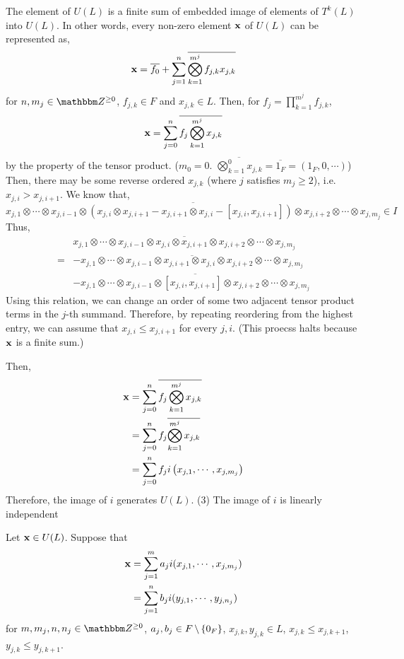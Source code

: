 The element of \(U(L)\) is a finite sum of embedded image of
elements of \(T^k(L)\) into \(U(L)\).
In other words, every non-zero element \(\mathbf{x}\) of \(U(L)\)
can be represented as,
\[\mathbf{x} = \overline{f_0} + \sum_{j=1}^{n} \overline{ \bigotimes_{k=1}^{m^j} f_{j,k} x_{j,k} }\]
for \(n, m_j \in \bbZ^{\ge 0}\), \(f_{j,k} \in F\) and \(x_{j, k} \in L\).
Then, for \(f_j = \prod_{k=1}^{m^j} f_{j,k}\),
\[\mathbf{x} = \sum_{j=0}^{n}  \overline{ f_j \bigotimes_{k=1}^{m^j} x_{j,k} }\]
by the property of the tensor product.
(\(m_0 = 0\). \(\overline{\bigotimes_{k=1}^{0} x_{j,k}} = \overline{1_F} = (1_F, 0, \cdots)\))
Then, there may be some reverse ordered \(x_{j, k}\) (where \(j\) satisfies \(m_j \ge 2\)),
i.e. \(x_{j, i} > x_{j, i+1}\).
We know that,
\[
  \overline{
  x_{j,1} \otimes \cdots \otimes x_{j,i-1} \otimes
  (x_{j,i} \otimes x_{j,i+1} - x_{j,i+1} \otimes x_{j,i} - [x_{j,i}, x_{j,i+1}]) \otimes x_{j,i+2} \otimes \cdots \otimes x_{j,m_j}
  }
  \in I
\]
Thus,
\begin{align*}
  &\overline{
  x_{j,1} \otimes \cdots \otimes x_{j,i-1} \otimes
  x_{j,i} \otimes x_{j,i+1} \otimes x_{j,i+2} \otimes \cdots \otimes x_{j,m_j}
  }
  \\=& - \overline{
  x_{j,1} \otimes \cdots \otimes x_{j,i-1} \otimes
   x_{j,i+1} \otimes x_{j,i} \otimes x_{j,i+2} \otimes \cdots \otimes x_{j,m_j}
  }
  \\& - \overline{
  x_{j,1} \otimes \cdots \otimes x_{j,i-1} \otimes
  [x_{j,i}, x_{j,i+1}] \otimes x_{j,i+2} \otimes \cdots \otimes x_{j,m_j}
  }
\end{align*}
Using this relation,
we can change an order of some two adjacent tensor product terms
in the \(j\)-th summand.
Therefore, by repeating reordering from the highest entry,
we can assume that \(x_{j, i} \le x_{j, i+1}\) for every \(j, i\).
(This proecss halts because \(\mathbf{x}\) is a finite sum.)

Then,
\begin{align*}
  \mathbf{x}
  &= \sum_{j=0}^{n} \overline{ f_j \bigotimes_{k=1}^{m^j} x_{j,k}}
  \\&= \sum_{j=0}^{n} f_j \overline{\bigotimes_{k=1}^{m^j} x_{j,k} }
  \\&= \sum_{j=0}^{n} f_j i \left(x_{j,1}, \cdots, x_{j,m_j} \right)
\end{align*}
Therefore, the image of \(i\) generates \(U(L)\).
\br
\noindent
(3) The image of \(i\) is linearly independent

Let \(\mathbf{x} \in U(L)\).
Suppose that
\begin{align*}
  \mathbf{x}
  &= \sum_{j=1}^m a_j i(x_{j,1},\cdots,x_{j,m_j})
  \\&= \sum_{j=1}^n b_j i(y_{j,1},\cdots,y_{j,n_j})
\end{align*}
for \(m, m_j, n, n_j \in \bbZ^{\ge 0}\), \(a_j, b_j \in F \,\backslash\, \{0_F\}\), \(x_{j, k}, y_{j, k} \in L\), \(x_{j,k} \le x_{j,k+1}\), \(y_{j,k} \le y_{j,k+1}\).

